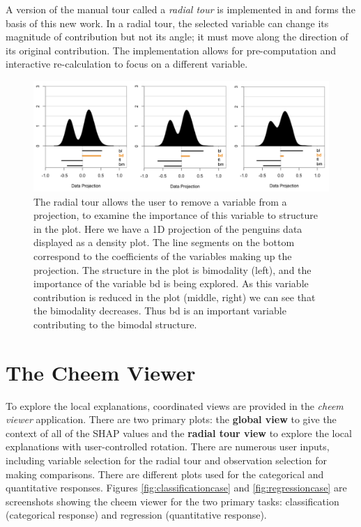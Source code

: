 \documentclass[
]{jss}
\begin{document}
A version of the manual tour called a \emph{radial tour} is implemented
in \citet{spyrison_spinifex_2020} and forms the basis of this new work.
In a radial tour, the selected variable can change its magnitude of
contribution but not its angle; it must move along the direction of its
original contribution. The implementation allows for pre-computation and
interactive re-calculation to focus on a different variable.

\begin{CodeChunk}
\begin{figure}

{\centering \includegraphics[width=0.99\linewidth]{./figures/radial_tour} 

}

\caption{The radial tour allows the user to remove a variable from a projection, to examine the importance of this variable to structure in the plot. Here we have a 1D projection of the penguins data displayed as a density plot. The line segments on the bottom correspond to the coefficients of the variables making up the projection. The structure in the plot is bimodality (left), and the importance of the variable \textsf{bd} is being explored. As this variable contribution is reduced in the plot (middle, right) we can see that the bimodality decreases. Thus \textsf{bd} is an important variable contributing to the bimodal structure.}\label{fig:radialtour}
\end{figure}
\end{CodeChunk}

\hypertarget{sec:cheemviewer}{%
\section{The Cheem Viewer}\label{sec:cheemviewer}}

To explore the local explanations, coordinated views
\citep{roberts_state_2007} \citep[also known as ensemble
graphics,][]{unwin_ensemble_2018} are provided in the \emph{cheem
viewer} application. There are two primary plots: the \textbf{global
view} to give the context of all of the SHAP values and the
\textbf{radial tour view} to explore the local explanations with
user-controlled rotation. There are numerous user inputs, including
variable selection for the radial tour and observation selection for
making comparisons. There are different plots used for the categorical
and quantitative responses. Figures \ref{fig:classificationcase} and
\ref{fig:regressioncase} are screenshots showing the cheem viewer for
the two primary tasks: classification (categorical response) and
regression (quantitative response).
\end{document}
